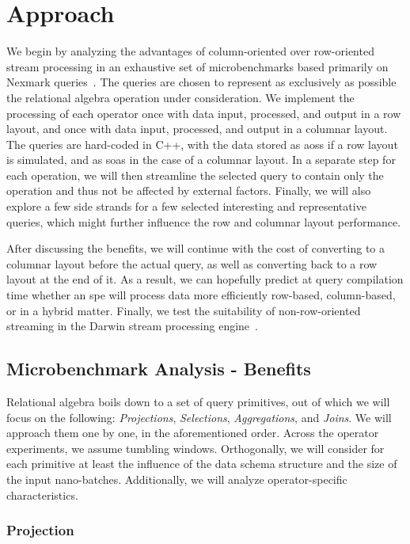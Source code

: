 \section{Approach}
\label{sec:approach}

We begin by analyzing the advantages of column-oriented over row-oriented stream processing in an exhaustive set of microbenchmarks based primarily on Nexmark queries~\cite{tucker2008nexmark}.
The queries are chosen to represent as exclusively as possible the relational algebra operation under consideration.
We implement the processing of each operator once with data input, processed, and output in a row layout, and once with data input, processed, and output in a columnar layout.
The queries are hard-coded in C++, with the data stored as \acp{aos} if a row layout is simulated, and as \acp{soa} in the case of a columnar layout.
In a separate step for each operation, we will then streamline the selected query to contain only the operation and thus not be affected by external factors.
Finally, we will also explore a few side strands for a few selected interesting and representative queries, which might further influence the row and columnar layout performance.

After discussing the benefits, we will continue with the cost of converting to a columnar layout before the actual query, as well as converting back to a row layout at the end of it.
As a  result, we can hopefully predict at query compilation time whether an \ac{spe} will process data more efficiently row-based, column-based, or in a hybrid matter.
Finally, we test the suitability of non-row-oriented streaming in the Darwin stream processing engine~\cite[]{DBLP:conf/cidr/BensonR22}.

\subsection{Microbenchmark Analysis - Benefits}
Relational algebra boils down to a set of query primitives, out of which we will focus on the following: \emph{Projections}, \emph{Selections}, \emph{Aggregations}, and \emph{Joins}.
We will approach them one by one, in the aforementioned order.
Across the operator experiments, we assume tumbling windows.
Orthogonally, we will consider for each primitive at least the influence of the data schema structure and the size of the input nano-batches.
Additionally, we will analyze operator-specific characteristics.

\subsubsection{Projection}

